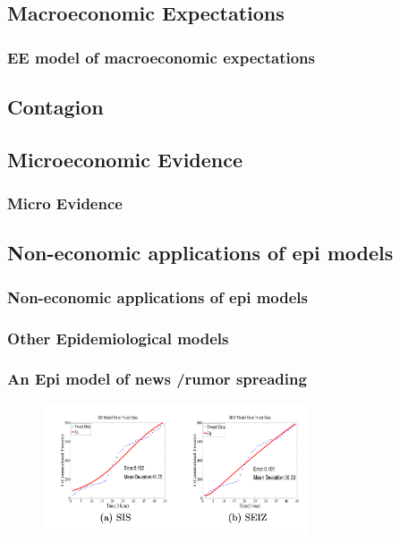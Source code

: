 \documentclass[pdflatex]{beamer}
\begin{document}
\subsection{Macroeconomic Expectations}\label{subsec:macroExp}

\begin{frame}
	\frametitle{EE model of macroeconomic expectations}

\end{frame}

\subsection{Contagion}\label{subsec:Contagion}

\subsection{Microeconomic Evidence}\label{subsec:microEvidence}


\begin{frame}
	\frametitle{Micro Evidence}
\end{frame}

\subsection{Non-economic applications of epi models}
\begin{frame}
	\frametitle{Non-economic applications of epi models}
\end{frame}
\begin{frame}
	\frametitle{Other Epidemiological models}

\end{frame}


\begin{frame}
	\frametitle{An Epi model of news /rumor spreading}
\begin{figure}[!ht] \centering  %
	\caption{\href{https://people.cs.vt.edu/ramakris/papers/news-rumor-epi-snakdd13.pdf}{\cite{jin2013epidemiological}}}
	\label{fig:news_curve}
	\centerline{\includegraphics[width=0.7\textwidth]{./figures/Obama.png}}
\end{figure}
\end{frame}
\end{document}
